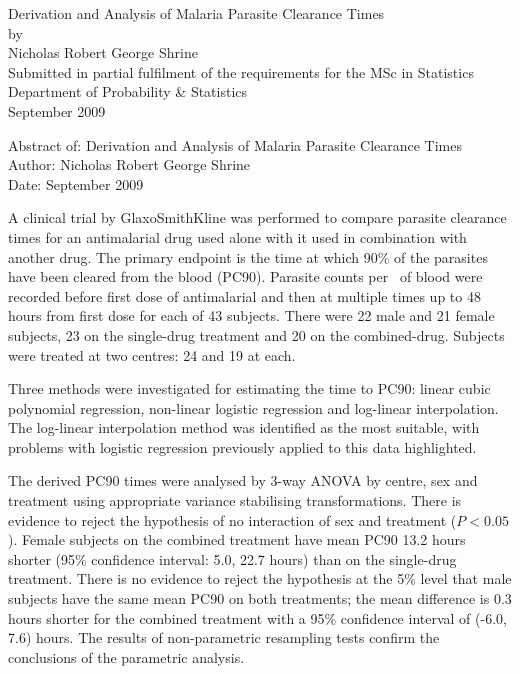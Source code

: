 \documentclass[a4paper,12pt,openright,twoside]{book}
\begin{document}
\begin{titlepage}
\vspace*{\fill}
\begin{center}
{\huge Derivation and Analysis of Malaria Parasite Clearance Times}\\[1cm]
by\\[1cm]
{\large Nicholas Robert George Shrine}\\[4cm]
Submitted in partial fulfilment of the requirements for the MSc in Statistics\\
Department of Probability \& Statistics\\[2cm]
September 2009
\end{center}
\vspace*{\fill}
\end{titlepage}
\clearpage{\pagestyle{empty}\cleardoublepage}
\frontmatter
Abstract of: Derivation and Analysis of Malaria Parasite Clearance Times\\[0.5cm]
Author: Nicholas Robert George Shrine\\[0.5cm]
Date: September 2009\\[0.1cm]
\setlength{\parindent}{0.4in}
\setlength{\parskip}{0.0in}

A clinical trial by GlaxoSmithKline was performed to compare parasite clearance times for an antimalarial drug used alone with it used in combination with another drug. The primary endpoint is the time at which 90\% of the parasites have been cleared from the blood (PC90). Parasite counts per \micro\liter\ of blood were recorded before first dose of antimalarial and then at multiple times up to 48 hours from first dose for each of 43 subjects. There were 22 male and 21 female subjects, 23 on the single-drug treatment and 20 on the combined-drug. Subjects were treated at two centres: 24 and 19 at each. 

Three methods were investigated for estimating the time to PC90: linear cubic polynomial regression, non-linear logistic regression and log-linear interpolation. The log-linear interpolation method was identified as the most suitable, with problems with logistic regression previously applied to this data highlighted.

The derived PC90 times were analysed by 3-way ANOVA by centre, sex and treatment using appropriate variance stabilising transformations. There is evidence to reject the hypothesis of no interaction of sex and treatment ($P<0.05$). Female subjects on the combined treatment have mean PC90 13.2 hours shorter (95\% confidence interval: 5.0, 22.7 hours) than on the single-drug treatment. There is no evidence to reject the hypothesis at the 5\% level that male subjects have the same mean PC90 on both treatments; the mean difference is 0.3 hours shorter for the combined treatment with a 95\% confidence interval of (-6.0, 7.6) hours. The results of non-parametric resampling tests confirm the conclusions of the parametric analysis.
\end{document}
